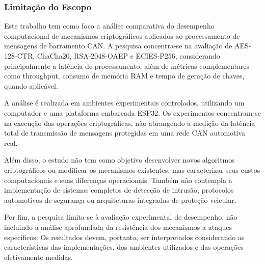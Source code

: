 \subsubsection{Limitação do Escopo}

Este trabalho tem como foco a análise comparativa do desempenho computacional de mecanismos criptográficos aplicados ao processamento de mensagens de barramento CAN. A pesquisa concentra-se na avaliação de AES-128-CTR, ChaCha20, RSA-2048-OAEP e ECIES-P256, considerando principalmente a latência de processamento, além de métricas complementares como throughput, consumo de memória RAM e tempo de geração de chaves, quando aplicável.

A análise é realizada em ambientes experimentais controlados, utilizando um computador e uma plataforma embarcada ESP32. Os experimentos concentram-se na execução das operações criptográficas, não abrangendo a medição da latência total de transmissão de mensagens protegidas em uma rede CAN automotiva real.

Além disso, o estudo não tem como objetivo desenvolver novos algoritmos criptográficos ou modificar os mecanismos existentes, mas caracterizar seus custos computacionais e suas diferenças operacionais. Também não contempla a implementação de sistemas completos de detecção de intrusão, protocolos automotivos de segurança ou arquiteturas integradas de proteção veicular.

Por fim, a pesquisa limita-se à avaliação experimental de desempenho, não incluindo a análise aprofundada da resistência dos mecanismos a ataques específicos. Os resultados devem, portanto, ser interpretados considerando as características das implementações, dos ambientes utilizados e das operações efetivamente medidas.


